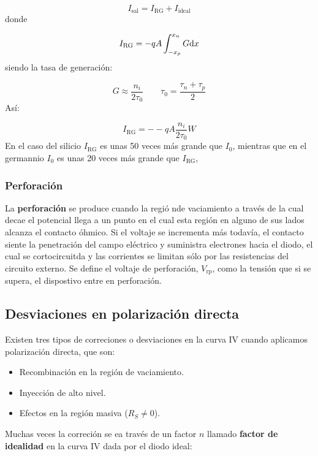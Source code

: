 \begin{equation}
    I_{\text{sal}} = I_{\text{RG}} + I_{\text{ideal}}
\end{equation}
donde 

\begin{equation}
    I_{\text{RG}} = - q A \int_{-x_p}^{x_n} G \mathrm{d} x
\end{equation}
siendo la tasa de generación: 

\begin{equation}
    G \approx \frac{n_i}{2\tau_0} \qquad \tau_0 = \frac{\tau_n+\tau_p}{2}
\end{equation}
Así: 

\begin{equation}
    I_{\text{RG}} = - -q A \frac{n_i}{2\tau_0} W
\end{equation}
En el caso del silicio $I_{\text{RG}}$ es unas 50 veces más grande que $I_0$, mientras que en el germannio $I_0$ es unas 20 veces más grande que $I_{\text{RG}}$,

\subsubsection{Perforación}

La \textbf{perforación} se produce cuando la regió nde vaciamiento a través de la cual decae el potencial llega a un punto en el cual esta región en alguno de sus lados alcanza el contacto óhmico. Si el voltaje se incrementa más todavía, el contacto siente la penetración del campo eléctrico y suministra electrones hacia el diodo, el cual se cortocircuitda y las corrientes se limitan sólo por las resistencias del circuito externo. Se define el voltaje de perforación, $V_{\text{rp}}$, como la tensión que si se supera, el dispostivo entre en perforación. 

\subsection{Desviaciones en polarización directa}

Existen tres tipos de correciones o desviaciones en la curva IV cuando aplicamos polarización directa, que son:

\begin{itemize}
    \item Recombinación en la región de vaciamiento.
    \item Inyección de alto nivel.
    \item Efectos en la región masiva ($R_S\neq 0$).
\end{itemize}
Muchas veces la correción se ea través de un factor $n$ llamado \textbf{factor de idealidad} en la curva IV dada por el diodo ideal: 

